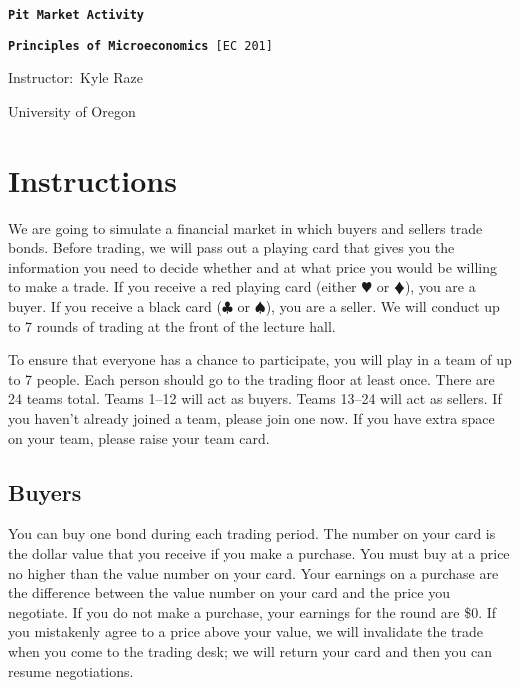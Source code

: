 \documentclass[12pt]{article}
\begin{document}
	
	\singlespacing 
	
	{\centering
		
		\Large \texttt{\textbf{Pit Market Activity}}
		
		
		
		\Large \texttt{\textbf{Principles of Microeconomics} [EC 201]}
		
		\normalsize
		
		Instructor:\ Kyle Raze
		
		University of Oregon \par
	}
	
	\section*{Instructions}
	
	We are going to simulate a financial market in which buyers and sellers trade bonds. Before trading, we will pass out a playing card that gives you the information you need to decide whether and at what price you would be willing to make a trade. If you receive a red playing card (either $\varheartsuit$ or $\vardiamondsuit$), you are a buyer. If you receive a black card ($\clubsuit$ or $\spadesuit$), you are a seller. We will conduct up to 7 rounds of trading at the front of the lecture hall. 
	
	\bigskip
	
	\noindent To ensure that everyone has a chance to participate, you will play in a team of up to 7 people. Each person should go to the trading floor at least once. There are 24 teams total. Teams 1--12 will act as buyers. Teams 13--24 will act as sellers. If you haven't already joined a team, please join one now. If you have extra space on your team, please raise your team card.
	
	\subsection*{Buyers} 
	
	You can buy one bond during each trading period. The number on your card is the dollar value that you receive if you make a purchase. You must buy at a price no higher than the value number on your card. Your earnings on a purchase are the difference between the value number on your card and the price you negotiate. If you do not make a purchase, your earnings for the round are \$0. If you mistakenly agree to a price above your value, we will invalidate the trade when you come to the trading desk; we will return your card and then you can resume negotiations. 
	
\end{document}
